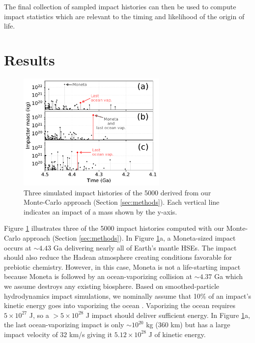 \documentclass[preprint]{aastex63}
\begin{document}
The final collection of sampled impact histories can then be used to compute impact statistics which are relevant to the timing and likelihood of the origin of life.

\section{Results}

\begin{figure}
  \centering
  \includegraphics[width=0.65\textwidth]{figures/example_impact_histories.pdf}
  \caption{Three simulated impact histories of the 5000 derived from our Monte-Carlo approach (Section \ref{sec:methods}). Each vertical line indicates an impact of a mass shown by the y-axis.}
  \label{fig:example_impact_histories}
\end{figure}

Figure \ref{fig:example_impact_histories} illustrates three of the 5000 impact histories computed with our Monte-Carlo approach (Section \ref{sec:methods}). In Figure \ref{fig:example_impact_histories}a, a Moneta-sized impact occurs at $\sim 4.43$ Ga delivering nearly all of Earth's mantle HSEs. The impact should also reduce the Hadean atmosphere creating conditions favorable for prebiotic chemistry. However, in this case, Moneta is not a life-starting impact because Moneta is followed by an ocean-vaporizing collision at $\sim 4.37$ Ga which we assume destroys any existing biosphere. Based on smoothed-particle hydrodynamics impact simulations, we nominally assume that 10\% of an impact's kinetic energy goes into vaporizing the ocean \citep[Appendix X,][]{Citron_2022}. Vaporizing the ocean requires $5 \times 10^{27}$ J, so a $> 5 \times 10^{28}$ J impact should deliver sufficient energy. In Figure \ref{fig:example_impact_histories}a, the last ocean-vaporizing impact is only $\sim 10^{20}$ kg (360 km) but has a large impact velocity of $32$ km/s giving it $5.12 \times 10^{28}$ J of kinetic energy. 
\end{document}

